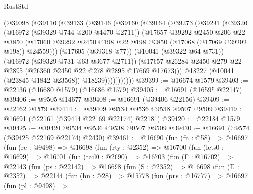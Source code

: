 \begin{lexlean}{RustStd}
\begin{coremodule}
            (@39098
              (@39116
                (@39133
                  (@39146
                    (@39160
                      (@39164
                        (@39273
                          (@39291
                            (@39326
                              (@16972 (@39329 @744 @200 @4470 @2711))
                              (@17657
                                @39292
                                @2450
                                @206
                                @22
                                @3850
                                (@17060
                                  @39292
                                  @2450
                                  @198
                                  @22
                                  @198
                                  @3850
                                  (@17068 (@17069 @39292 @198))
                                  @24559)))
                            (@17605 (@39318 @77))
                            (@10041 (@39322 @64 @731))
                            (@16972 (@39329 @731 @63 @3677 @2711))
                            (@17657
                              @26284
                              @2450
                              @279
                              @22
                              @2895
                              (@26360 @2450 @22 @278 @2895 @17669 @17673)))
                          @18227
                          (@10041 (@23845 @1842 @23568))
                          @18239)))))))))))
@39399 := @16674 @1579
@39403 := @22136 (@16680 @1579) (@16686 @1579)
@39405 := @16691 (@16595 @22147)
@39406 := @9505 @14677
@39408 := @16691 (@39406 @22156)
@39409 := @22162 @1579
@39414 := @39409 @9534 @9536 @9538 @9507 @9509
@39419 := @16691 (@22161 (@39414 @22169 @22174) @22181)
@39420 := @22184 @1579
@39425 := @39420 @9534 @9536 @9538 @9507 @9509
@39430 := @16691 (@9574 (@39425 @22169 @22174) @2430)
@39461 := @16690
    (fun (fn : @58) =>
    @16697
      (fun (rc : @9498) =>
      @16698
        (fun (rty : @2352) =>
        @16700
          (fun (lets0 : @16699) =>
          @16701
            (fun (tail0 : @2690) =>
            @16703
              (fun (Γ : @16702) =>
              @22143
                (fun (ps : @22142) =>
                @16698
                  (fun (S : @2352) =>
                  @16698
                    (fun (D : @2352) =>
                    @22144
                      (fun (hn : @28) =>
                      @16778
                        (fun (pns : @16777) =>
                        @16697
                          (fun (pl : @9498) =>

\end{coremodule}
\end{lexlean}
